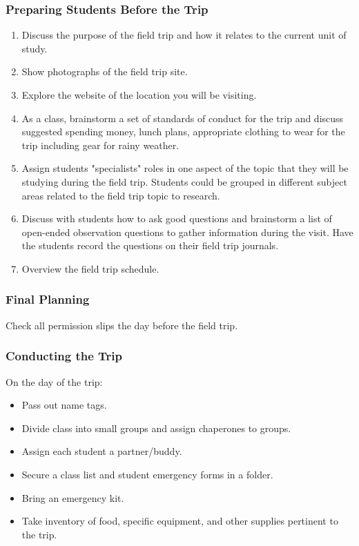 \subsubsection*{Preparing Students Before the Trip}
\begin{enumerate}
\item Discuss the purpose of the field trip and how it relates to the current unit of study.
\item Show photographs of the field trip site.
\item Explore the website of the location you will be visiting.
\item As a class, brainstorm a set of standards of conduct for the trip and discuss suggested spending
money, lunch plans, appropriate clothing to wear for the trip including gear for rainy weather.
\item Assign students "specialists" roles in one aspect of the topic that they will be studying during the
field trip. Students could be grouped in different subject areas related to the field trip topic to
research.
\item Discuss with students how to ask good questions and brainstorm a list of open-ended
observation questions to gather information during the visit. Have the students record the
questions on their field trip journals.
\item Overview the field trip schedule.
\end{enumerate}
\subsubsection*{Final Planning}
Check all permission slips the day before the field trip.
\subsubsection*{Conducting the Trip}
On the day of the trip:
\begin{itemize}
\item Pass out name tags.
\item Divide class into small groups and assign chaperones to groups.
\item Assign each student a partner/buddy.
\item Secure a class list and student emergency forms in a folder.
\item Bring an emergency kit.
\item Take inventory of food, specific equipment, and other supplies pertinent to the trip.
\end{itemize}


